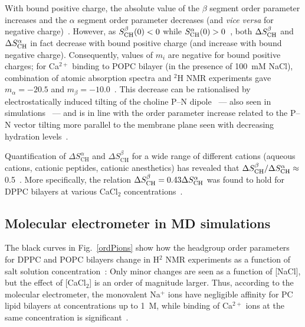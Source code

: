 \documentclass[twoside,twocolumn,9pt]{article}
\begin{document}
With bound positive charge, the absolute value of the $\beta$ segment order parameter increases
and the $\alpha$ segment order parameter decreases 
(and {\it vice versa} for negative charge)~\cite{brown77,akutsu81,altenbach84,altenbach85,seelig87,scherer89,rydall92}. 
However, as $S_{\rm{CH}}^{\beta}(0)<0$ while $S_{\rm{CH}}^{\alpha}(0)>0$~\cite{hong95a,hong95b,gross97}, %
both $\Delta S_{\rm{CH}}^{\beta}$ and $\Delta S_{\rm{CH}}^{\alpha}$ in fact decrease with bound positive charge 
(and increase with bound negative charge). Consequently, values of $m_i$ are negative for
bound positive charges; %
for Ca$^{2+}$ binding to POPC bilayer (in the presence of 100~mM NaCl),
combination of atomic absorption spectra and $^2$H NMR experiments gave
$m_\alpha=-20.5$  and $m_\beta=-10.0$~\cite{altenbach84}.
This decrease can be rationalised by electrostatically 
induced tilting of the choline P--N dipole~\cite{seelig87,scherer89,seelig90} --- also
seen in simulations~\cite{gurtovenko05,cordomi08,cordomi09,zhao12} ---
and is in line with the order parameter increase related to the P--N vector tilting more parallel to the membrane plane seen with decreasing hydration levels~\cite{botan15}. 


Quantification of $\Delta S_\mathrm{CH}^\alpha$ and $\Delta S_\mathrm{CH}^\beta$
for a wide range of different cations (aqueous cations, cationic peptides, cationic anesthetics)
has revealed that $\Delta S_{\rm{CH}}^{\beta}/\Delta S_{\rm{CH}}^{\alpha} \approx$\,0.5~\cite{beschiasvili91,rydall92}.
More specifically,
the relation $\Delta S_{\rm{CH}}^{\beta}=0.43 \Delta S_{\rm{CH}}^{\alpha}$ was found to hold for DPPC bilayers
at various CaCl$_2$ concentrations~\cite{akutsu81}.


\subsection{Molecular electrometer in MD simulations}\label{electrometerinsimulations}

The black curves in Fig.~\ref{ordPions} show how the headgroup order parameters
for DPPC and POPC bilayers change in H$^2$ NMR experiments
as a function of salt solution concentration~\cite{akutsu81,altenbach84}:
Only minor changes are seen
as a function of [NaCl], 
but the effect of [CaCl$_2$] is an order of magnitude larger. 
Thus, according to the molecular electrometer, 
the monovalent Na$^+$ ions have negligible affinity for PC lipid bilayers at concentrations up to 1~M,
while binding of Ca$^{2+}$ ions at the same concentration is significant~\cite{akutsu81,altenbach84}. 
\end{document}
